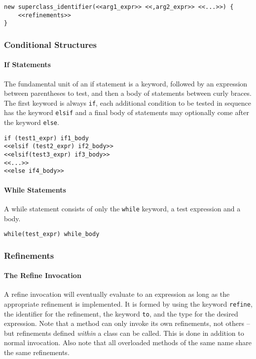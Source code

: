 \begin{lstlisting}
new superclass_identifier(<<arg1_expr>> <<,arg2_expr>> <<...>>) {
    <<refinements>>
}
\end{lstlisting}

\subsubsection{Conditional Structures}
\paragraph{If Statements}
The fundamental unit of an if statement is a keyword, followed by an expression between parentheses to test, and then a body of statements between curly braces. The first keyword is always \verb!if!, each additional condition to be tested in sequence has the keyword \verb!elsif! and a final body of statements may optionally come after the keyword \verb!else!.

\begin{lstlisting}
if (test1_expr) if1_body
<<elsif (test2_expr) if2_body>>
<<elsif(test3_expr) if3_body>>
<<...>>
<<else if4_body>>
\end{lstlisting}

\paragraph{While Statements}
A while statement consists of only the \verb!while! keyword, a test expression and a body.

\begin{lstlisting}
while(test_expr) while_body
\end{lstlisting}

\subsubsection{Refinements}
\paragraph{The Refine Invocation}
A refine invocation will eventually evaluate to an expression as long as the appropriate refinement is implemented. It is formed by using the keyword \verb!refine!, the identifier for the refinement, the keyword \verb!to!, and the type for the desired expression. Note that a method can only invoke its own refinements, not others -- but refinements defined \emph{within} a class can be called. This is done in addition to normal invocation. Also note that all overloaded methods of the same name share the same refinements.

